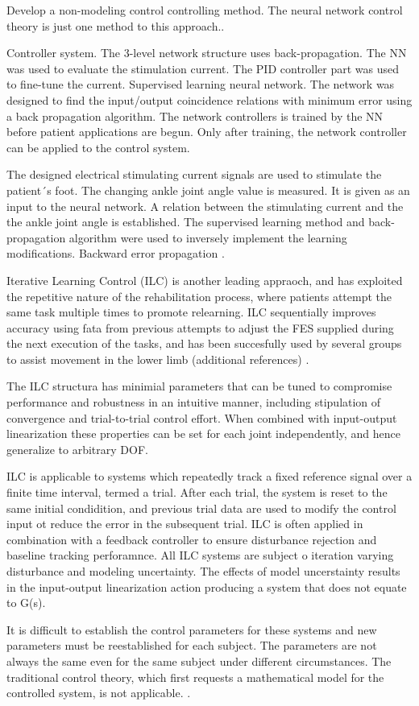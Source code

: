 Develop a non-modeling control controlling method. The neural network control theory is just one method to this approach.\cite{NNPID}.

Controller system. The 3-level network structure uses back-propagation. The NN was used to evaluate the stimulation current. The PID controller part was used to fine-tune the current. Supervised learning neural network. The network was designed to find the input/output coincidence relations with minimum error using a back propagation algorithm. The network controllers is trained by the NN before patient applications are begun. Only after training, the network controller can be applied to the control system. \cite{NNPID}

The designed electrical stimulating current signals are used to stimulate the patient´s foot. The changing ankle joint angle value is measured. It is given as an input to the neural network. A relation between the stimulating current and the the ankle joint angle is established. The supervised learning method and back-propagation algorithm were used to inversely implement the learning modifications. Backward error propagation \cite{NNPID}.

Iterative Learning Control (ILC) is another leading appraoch, and has exploited the repetitive nature of the rehabilitation process, where patients attempt the same task multiple times to promote relearning. ILC sequentially improves accuracy using fata from previous attempts to adjust the FES supplied during the next execution of the tasks, and has been succesfully used by several groups to assist movement in the lower limb (additional references) \cite{IOL}.

The ILC structura has minimial parameters that can be tuned to compromise performance and robustness in an intuitive manner, including stipulation of convergence and trial-to-trial control effort. When combined with input-output linearization these properties can be set for each joint independently, and hence generalize to arbitrary DOF. \cite{IOL}

ILC is applicable to systems which repeatedly track a fixed reference signal over a finite time interval, termed a trial. 
After each trial, the system is reset to the same initial condidition, and previous trial data are used to modify the control input ot reduce the error in the subsequent trial. ILC is often applied in combination with a feedback controller to ensure disturbance rejection and baseline tracking perforamnce. All ILC systems are subject o iteration varying disturbance and modeling uncertainty. The effects of model uncerstainty results in the input-output linearization action producing a system that does not equate to G(s). 




It is difficult to establish the control parameters for these systems and new parameters must be reestablished for each subject. The parameters are not always the same even for the same subject under different circumstances. The traditional control theory, which first requests a mathematical model for the controlled system, is not applicable. \cite{NNPID}.
